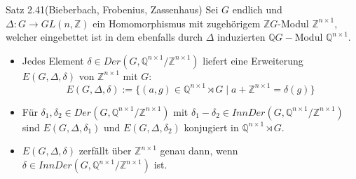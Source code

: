 \documentclass{beamer}
\begin{document}
\begin{frame}
\begin{block}{Satz 2.41(Bieberbach, Frobenius, Zassenhaus)}
Sei $G$ endlich und $\Delta:G\to GL(n,\mathbb{Z})$ ein Homomorphismus mit zugehörigem $\mathbb{Z}G$-Modul $\mathbb{Z}^{n\times 1},$ welcher eingebettet ist in dem ebenfalls durch $\Delta$ induzierten $\mathbb{Q}G-$Modul $\mathbb{Q}^{n\times 1}.$
\begin{itemize}
\item Jedes Element $\delta\in Der(G,\mathbb{Q}^{n\times 1}/\mathbb{Z}^{n\times 1})$ liefert eine Erweiterung $E(G,\Delta,\delta)$ von $\mathbb{Z}^{n\times 1}$ mit $G:$
\[
E(G,\Delta,\delta):=\{(a,g)\in \mathbb{Q}^{n\times 1}\rtimes G\mid a+\mathbb{Z}^{n\times 1}=\delta(g)\}
\]
\item Für $\delta_1,\delta_2\in Der(G,\mathbb{Q}^{n\times 1}/\mathbb{Z}^{n\times 1})$ mit $\delta_1-\delta_2\in InnDer(G,\mathbb{Q}^{n\times 1}/\mathbb{Z}^{n\times 1})$ sind $E(G,\Delta,\delta_1)$ und $E(G,\Delta,\delta_2)$ konjugiert in $\mathbb{Q}^{n\times 1}\rtimes G.$
\item $E(G,\Delta,\delta)$ zerfällt über $\mathbb{Z}^{n \times 1}$ genau dann, wenn $\delta \in InnDer(G,\mathbb{Q}^{n\times 1}/\mathbb{Z}^{n\times 1})$ ist.
 
\end{itemize}
\end{block}
\end{frame}
\end{document}
